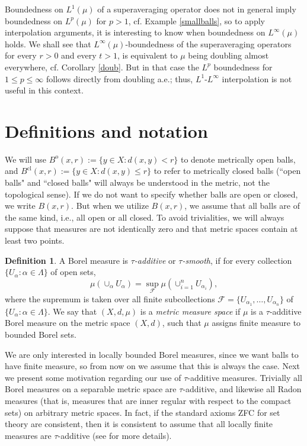 \documentclass[12pt]{amsart}
\theoremstyle{definition}
\newtheorem{definition}[theorem]{Definition}
\theoremstyle{parrafo}
\begin{document}
 Boundedness on $L^1 (\mu)$ of a superaveraging operator does not in general  imply boundedness on $L^p (\mu)$ for $p > 1$, cf. Example \ref{smallballs}, so to apply interpolation arguments, it is interesting to know when boundedness on $L^\infty (\mu)$ holds. We shall see that $L^\infty(\mu)$-boundedness of the superaveraging operators for every $r > 0$ and every $t >1$, is equivalent to $\mu$ being doubling almost everywhere, cf. Corollary \ref{doub}.
But in that case the $L^p$ boundedness for $1\le p \le \infty$ follows directly from doubling a.e.; thus,
 $L^1$-$L^\infty$ interpolation is not useful in this context. 

	\section {Definitions and notation} 
	
	We will use $B^{\operatorname{o}}(x,r) := \{y\in X: d(x,y) < r\}$ to denote metrically open balls, \textit{}
	and 
	$B^{\operatorname{cl}}(x,r) := \{y\in X: d(x,y) \le r\}$ to refer to metrically closed balls (``open balls" and ``closed balls" will always be understood in the metric, not the
	topological sense). 
	If we do not want to specify whether balls are open or closed,
	we write $B(x,r)$. But when we utilize $B(x,r)$, we assume that all balls are of the same kind, i.e., all open or all closed.  
	To avoid trivialities, we will always suppose that measures are not identically zero and that metric spaces contain at least two points.
	
	
	\begin{definition} A Borel measure is   {\em $\tau$-additive} or {\em $\tau$-smooth}, if for every
		collection  $\{U_\alpha : \alpha \in \Lambda\}$
		of  open sets, 
		$$
		\mu (\cup_\alpha U_\alpha) = \sup_{\mathcal{F}} \mu(\cup_{i=1}^nU_{\alpha_i}),
		$$
		where the supremum is taken over all finite subcollections $\mathcal{F} = \{U_{\alpha_1}, \dots, U_{\alpha_n} \}$ of  $\{U_\alpha : \alpha \in \Lambda\}$.
		We say that $(X, d, \mu)$ is a {\em metric measure space} if
		$\mu$ is a  $\tau$-additive  Borel measure on the metric space $(X, d)$, such that $\mu$ assigns finite measure to bounded Borel sets.
	\end{definition} 
We are only interested in locally bounded Borel measures, since we want balls to have finite measure, so from now on we assume that this is always the case. 
Next  we present some motivation regarding our use of $\tau$-additive measures.
Trivially all Borel measures on a separable metric space are $\tau$-additive, and likewise all Radon measures (that is, measures that are inner regular with respect to the compact sets) on arbitrary metric spaces. In fact, if the standard axioms ZFC for set theory  are consistent, then it is consistent to assume that all
locally finite measures are $\tau$-additive (see \cite[Proposition 7. 2. 10]{Bo} for more details). 
\end{document}
